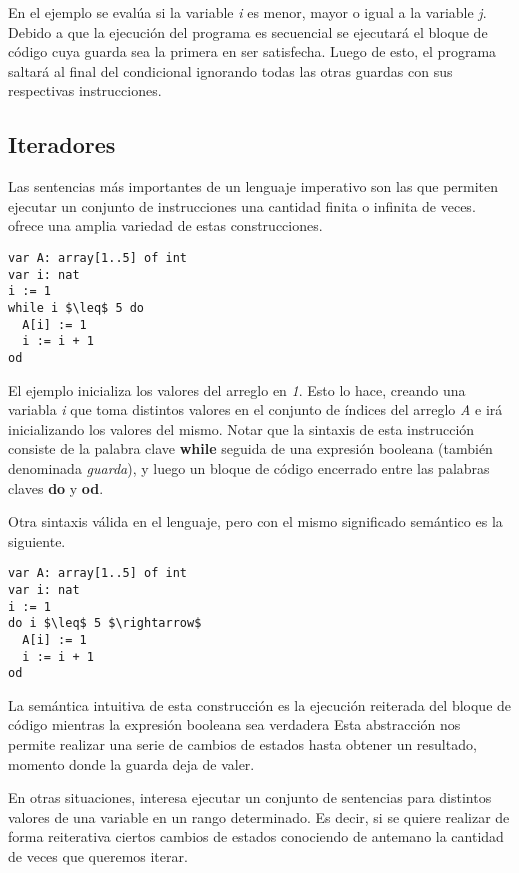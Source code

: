 \documentclass{article}
\begin{document}
En el ejemplo se evalúa si la variable \textit{i} es menor, mayor o igual a la variable \textit{j}.
Debido a que la ejecución del programa es secuencial se ejecutará el bloque de código cuya guarda sea la primera en ser satisfecha.
Luego de esto, el programa saltará al final del condicional ignorando todas las otras guardas con sus respectivas instrucciones.

\subsection{Iteradores}

Las sentencias más importantes de un lenguaje imperativo son las que permiten ejecutar un conjunto de instrucciones una cantidad finita o infinita de veces.
\Lang\space ofrece una amplia variedad de estas construcciones.

\begin{lstlisting}
var A: array[1..5] of int
var i: nat
i := 1
while i $\leq$ 5 do
  A[i] := 1
  i := i + 1
od
\end{lstlisting}

El ejemplo inicializa los valores del arreglo en \textit{1}.
Esto lo hace, creando una variabla \textit{i} que toma distintos valores en el conjunto de índices del arreglo \textit{A} e irá inicializando los valores del mismo.
Notar que la sintaxis de esta instrucción consiste de la palabra clave \textbf{while} seguida de una expresión booleana (también denominada \textit{guarda}), y luego un bloque de código encerrado entre las palabras claves \textbf{do} y \textbf{od}.

Otra sintaxis válida en el lenguaje, pero con el mismo significado semántico es la siguiente.

\begin{lstlisting}
var A: array[1..5] of int
var i: nat
i := 1
do i $\leq$ 5 $\rightarrow$
  A[i] := 1
  i := i + 1
od
\end{lstlisting}

La semántica intuitiva de esta construcción es la ejecución reiterada del bloque de código mientras la expresión booleana sea verdadera
Esta abstracción nos permite realizar una serie de cambios de estados hasta obtener un resultado, momento donde la guarda deja de valer.

En otras situaciones, interesa ejecutar un conjunto de sentencias para distintos valores de una variable en un rango determinado.
Es decir, si se quiere realizar de forma reiterativa ciertos cambios de estados conociendo de antemano la cantidad de veces que queremos iterar.
\end{document}
